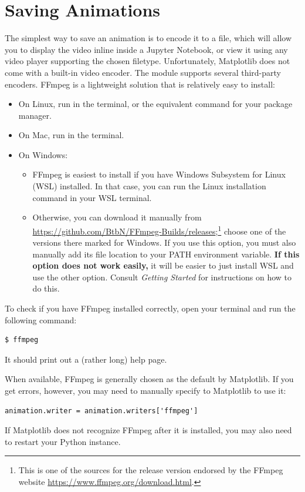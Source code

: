\section*{Saving Animations}
The simplest way to save an animation is to encode it to a  file, which will allow you to display the video inline inside a Jupyter Notebook, or view it using any video player supporting the chosen filetype.
Unfortunately, Matplotlib does not come with a built-in video encoder.
The  module supports several third-party encoders. 
FFmpeg is a lightweight solution that is relatively easy to install:
\begin{itemize}
\item On Linux, run  in the terminal, or the equivalent command for your package manager.
\item On Mac, run  in the terminal.
\item On Windows:
	\begin{itemize}
	\item FFmpeg is easiest to install if you have Windows Subsystem for Linux (WSL) installed. In that case, you can run the Linux installation command in your WSL terminal.
	\item Otherwise, you can download it manually from \url{https://github.com/BtbN/FFmpeg-Builds/releases};\footnote{This is one of the sources for the release version endorsed by the FFmpeg website \url{https://www.ffmpeg.org/download.html}.}
	choose one of the versions there marked for Windows.
	If you use this option, you must also manually add its file location to your PATH environment variable.
	\textbf{If this option does not work easily,} it will be easier to just install WSL and use the other option.
	Consult \emph{Getting Started} for instructions on how to do this.
	\end{itemize}
\end{itemize}
To check if you have FFmpeg installed correctly, open your terminal and run the following command:
\begin{lstlisting}
$ ffmpeg
\end{lstlisting}
It should print out a (rather long) help page.

When available, FFmpeg is generally chosen as the default by Matplotlib.
If you get errors, however, you may need to manually specify to Matplotlib to use it:
\begin{lstlisting}
animation.writer = animation.writers['ffmpeg']
\end{lstlisting}
If Matplotlib does not recognize FFmpeg after it is installed, you may also need to restart your Python instance.

